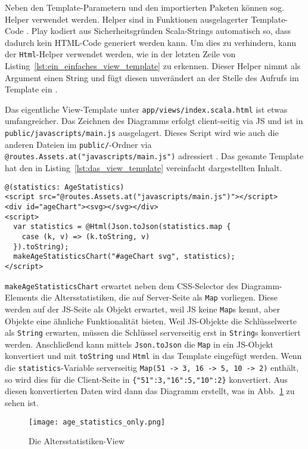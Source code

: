 Neben den Template-Parametern und den importierten Paketen können sog. Helper verwendet werden.
Helper sind in Funktionen ausgelagerter Template-Code \cite[vgl.][S.~227]{play_for_scala_v8}.
Play kodiert aus Sicherheitsgründen Scala-Strings automatisch so, dass dadurch kein HTML-Code generiert werden kann.
Um dies zu verhindern, kann der \lstinline|Html|-Helper verwendet werden, wie in der letzten Zeile von Listing~\ref{lst:ein_einfaches_view_template} zu erkennen.
Dieser Helper nimmt als Argument einen String und fügt diesen unverändert an der Stelle des Aufrufs im Template ein \cite[vgl.][]{play_templates}.

Das eigentliche View-Template unter \lstinline|app/views/index.scala.html| ist etwas umfangreicher.
Das Zeichnen des Diagramms erfolgt client-seitig via JS und ist in \lstinline|public/javascripts/main.js| ausgelagert.
Dieses Script wird wie auch die anderen Dateien im \lstinline|public/|-Ordner via \lstinline|@routes.Assets.at("javascripts/main.js")| adressiert \cite[vgl.][S.~136]{play_for_scala_v8}.
Das gesamte Template hat den in Listing~\ref{lst:das_view_template} vereinfacht dargestellten Inhalt.

\begin{lstlisting}[caption=Das View-Template, label=lst:das_view_template]
@(statistics: AgeStatistics)
<script src="@routes.Assets.at("javascripts/main.js")"></script>
<div id="ageChart"><svg></svg></div>
<script>
  var statistics = @Html(Json.toJson(statistics.map {
    case (k, v) => (k.toString, v)
  }).toString);
  makeAgeStatisticsChart("#ageChart svg", statistics);
</script>
\end{lstlisting}

\lstinline|makeAgeStatisticsChart| erwartet neben dem CSS-Selector des Diagramm-Elements die Altersstatistiken, die auf Server-Seite als \lstinline|Map| vorliegen.
Diese werden auf der JS-Seite als Objekt erwartet, weil JS keine \lstinline|Map|s kennt, aber Objekte eine ähnliche Funktionalität bieten.
Weil JS-Objekte die Schlüsselwerte als \lstinline|String| erwarten, müssen die Schlüssel serverseitig erst in \lstinline|String|s konvertiert werden.
Anschließend kann mittels \lstinline|Json.toJson|  die \lstinline|Map| in ein JS-Objekt konvertiert und mit \lstinline|toString| und \lstinline|Html| in das Template eingefügt werden.
Wenn die \lstinline|statistics|-Variable serverseitig \lstinline|Map(51 -> 3, 16 -> 5, 10 -> 2)| enthält, so wird dies für die Client-Seite in \lstinline|{"51":3,"16":5,"10":2}| konvertiert.
Aus diesen konvertierten Daten wird dann das Diagramm erstellt, was in Abb.~\ref{fig:die_altersstatistiken_view} zu sehen ist.

\begin{figure}
\centering
\texttt{[image: age\_statistics\_only.png]}
\caption{Die Altersstatistiken-View}
\label{fig:die_altersstatistiken_view}
\end{figure}



